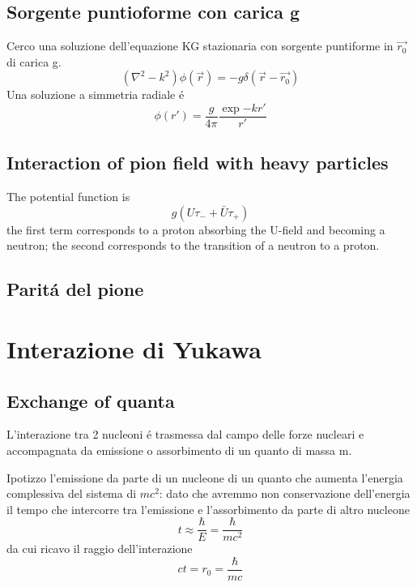 \documentclass[main.tex]{subfiles}
\begin{document}
\subsection{Sorgente puntioforme con carica g}

Cerco una soluzione dell'equazione KG stazionaria con sorgente puntiforme in $\vec{r_0}$ di carica g.
\begin{equation*}
(\nabla^2-k^2)\phi(\vec{r})=-g\delta(\vec{r}-\vec{r_0})
\end{equation*}
Una soluzione a simmetria radiale \'e 
\begin{equation*}
\phi(r')=\frac{g}{4\pi}\frac{\exp{-kr'}}{r'}
\end{equation*}

\subsection{Interaction of pion field with heavy particles}

The potential function is
\begin{equation*}
g(U\tau_-+\bar{U}\tau_+)
\end{equation*}
the first term corresponds to a proton absorbing the U-field and becoming a neutron; the second corresponds to the transition of a neutron to a proton.

\subsection{Parit\'a del pione}

\section{Interazione di Yukawa}

\subsection{Exchange of quanta}
L'interazione tra 2 nucleoni \'e trasmessa dal campo delle forze nucleari e accompagnata da emissione o assorbimento di un quanto di massa m.

Ipotizzo l'emissione da parte di un nucleone di un quanto che aumenta l'energia complessiva del sistema di $mc^2$:
dato che avremmo non conservazione dell'energia il tempo che intercorre tra l'emissione e l'assorbimento da parte di altro nucleone
\begin{equation*}
t\approx\frac{\hbar}{E}=\frac{\hbar}{mc^2}
\end{equation*}
da cui ricavo il raggio dell'interazione
\begin{equation*}
ct=r_0=\frac{\hbar}{mc}
\end{equation*}
\end{document}
